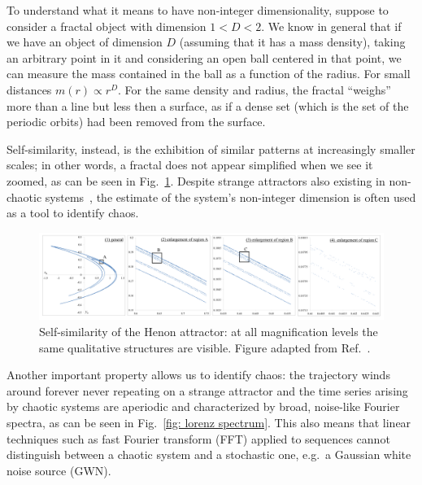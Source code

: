 To understand what it means to have non-integer dimensionality, suppose
to consider a fractal object with dimension $1 < D < 2$.
We know in general that if we have an object of dimension $D$ (assuming that
it has a mass density), taking an arbitrary point in it and considering an open
ball centered in that point, we can measure the mass contained in the ball as
a function of the radius. For small distances $m(r)\propto r^D$. For the same density
and radius, the fractal ``weighs'' more than a line but less then a surface, as if
a dense set (which is the set of the periodic orbits) had been removed from the
surface.

Self-similarity, instead, is the exhibition of similar patterns at increasingly smaller
scales; in other words, a fractal does not appear simplified when we see it zoomed,
as can be seen in Fig.~\ref{fig: henon fractal}. Despite strange attractors
also existing in non-chaotic systems~\cite{ref:strange_attractors_non_chaotic}, the estimate of the system's non-integer dimension
is often used as a tool to identify chaos.

\begin{figure}[!htbp]
    \centering
    \includegraphics[width=\linewidth]{images/henon_fractal.png}
    \caption{Self-similarity of the Henon attractor: at all magnification levels the same
    qualitative structures are visible. Figure adapted from Ref.~\cite{henon2004two}.
    }\label{fig: henon fractal}
\end{figure}

Another important property allows
us to identify chaos: the trajectory winds around forever never repeating on a
strange attractor and the time series arising by chaotic systems are aperiodic
and characterized by broad, noise-like Fourier spectra, as can be seen in Fig.~\ref{fig: lorenz spectrum}.
This also means that linear techniques
such as fast Fourier transform (FFT) applied to sequences cannot distinguish between a chaotic system
and a stochastic one, e.g.\ a Gaussian white noise source (GWN).

